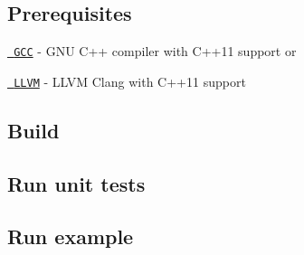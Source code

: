 \subsection*{Prerequisites}


\begin{DoxyItemize}
\item \href{https://gcc.gnu.org/}{\texttt{ G\+CC}} -\/ G\+NU C++ compiler with C++11 support or
\item \href{https://clang.llvm.org/}{\texttt{ L\+L\+VM}} -\/ L\+L\+VM Clang with C++11 support
\end{DoxyItemize}

\subsection*{Build}


\begin{DoxyCode}{0}
\end{DoxyCode}


\subsection*{Run unit tests}


\begin{DoxyCode}{0}
\end{DoxyCode}


\subsection*{Run example}


\begin{DoxyCode}{0}
\end{DoxyCode}
 